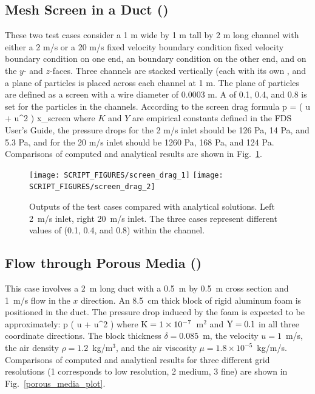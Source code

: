 \documentclass[11pt]{book}
\begin{document}
\subsection{Mesh Screen in a Duct (\texorpdfstring{}{screen\_drag})}
\label{screen_drag_1}
\label{screen_drag_2}

These two test cases consider a 1 m wide by 1 m tall by 2 m long channel with either a 2 m/s or a 20 m/s fixed velocity boundary condition fixed velocity boundary condition on one end, an  boundary condition on the other end, and  on the $y$- and $z$-faces.  Three channels are stacked vertically (each with its own , and a plane of particles is placed across each channel at 1 m.  The plane of particles are defined as a screen with a wire diameter of 0.0003 m.  A  of 0.1, 0.4, and 0.8 is set for the particles in the channels.  According to the screen drag formula
\be
   \Delta p \;= \; \left(  u \; + \; \rho {} u^2 \right) \Delta x_{\rm screen}
\ee
where $K$ and $Y$ are empirical constants defined in the FDS User's Guide, the pressure drops for the 2 m/s inlet should be 126 Pa, 14 Pa, and 5.3 Pa, and for the 20 m/s inlet should be 1260 Pa, 168 Pa, and 124 Pa.   Comparisons of computed and analytical results are shown in Fig.~\ref{screen_drag_plots}.

\begin{figure}[ht]
\texttt{[image: SCRIPT\_FIGURES/screen\_drag\_1]}
\texttt{[image: SCRIPT\_FIGURES/screen\_drag\_2]}
\caption[Sample cases ]{Outputs of the  test cases compared with analytical solutions.  Left 2~m/s inlet, right 20~m/s inlet.  The three cases represent different values of  (0.1, 0.4, and 0.8) within the channel.}
\label{screen_drag_plots}
\end{figure}

\subsection{Flow through Porous Media (\texorpdfstring{}{porous\_media})}
\label{porous_media}

This case involves a 2~m long duct with a 0.5~m by 0.5~m cross section and 1~m/s flow in the $x$ direction. An 8.5~cm thick block of rigid aluminum foam is positioned in the duct. The pressure drop induced by the foam is expected to be approximately:
\be
   \Delta p \approx \delta \left(  u \; + \; \rho {} u^2 \right)
\ee
where ${\rm K}=1 \times 10^{-7}$~m$^2$ and ${\rm Y}=0.1$ in all three coordinate directions. The block thickness $\delta=0.085$~m, the velocity $u=1$~m/s, the air density $\rho=1.2$~kg/m$^3$, and the air viscosity $\mu=1.8 \times 10^{-5}$~kg/m/s. Comparisons of computed and analytical results for three different grid resolutions (1 corresponds to low resolution, 2 medium, 3 fine) are shown in Fig.~\ref{porous_media_plot}.
\end{document}
